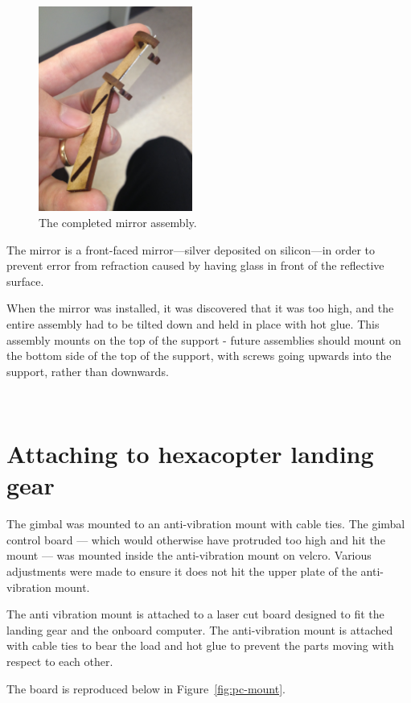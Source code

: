 \documentclass[12pt,oneside,a4paper]{book}
\begin{document}
\begin{figure}
  \centering
  \includegraphics[width=0.45\textwidth]{figs/mirror}
  \caption{The completed mirror assembly.}
  \label{fig:mirror}
\end{figure}

The mirror is a front-faced mirror---silver deposited on silicon---in
order to prevent error from refraction caused by having glass in front
of the reflective surface.

When the mirror was installed, it was discovered that it was too high,
and the entire assembly had to be tilted down and held in place with
hot glue. This assembly mounts on the top of the support - future
assemblies should mount on the bottom side of the top of the support,
with screws going upwards into the support, rather than downwards.

\newpage~\newpage
\section{Attaching to hexacopter landing gear}
\label{sec:attach-hexac-land}

The gimbal was mounted to an anti-vibration mount with cable
ties. The gimbal control board --- which would otherwise have
protruded too high and hit the mount --- was mounted inside the
anti-vibration mount on velcro. Various adjustments were made to
ensure it does not hit the upper plate of the anti-vibration mount.

The anti vibration mount is attached to a laser cut board designed to
fit the landing gear and the onboard computer. The anti-vibration
mount is attached with cable ties to bear the load and hot glue to
prevent the parts moving with respect to each other.

The board is reproduced below in Figure~\ref{fig:pc-mount}.
\end{document}
